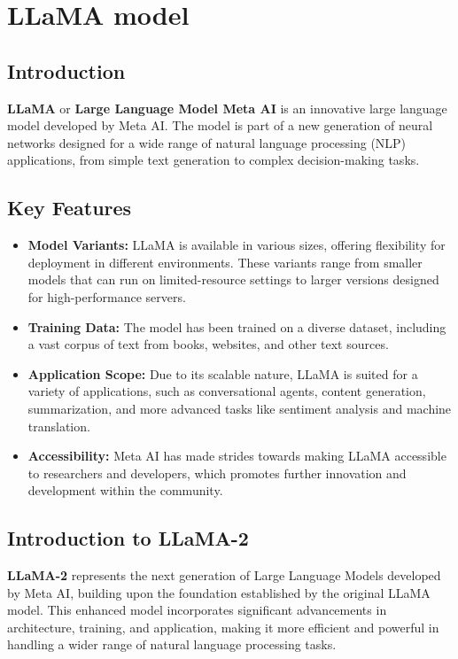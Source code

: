 \section{LLaMA model}

\subsection{Introduction}
\textbf{LLaMA} or \textbf{Large Language Model Meta AI} is an innovative large language model developed by Meta AI. The model is part of a new generation of neural networks designed for a wide range of natural language processing (NLP) applications, from simple text generation to complex decision-making tasks.

\subsection{Key Features}

\begin{itemize}
	\item \textbf{Model Variants:} LLaMA is available in various sizes, offering flexibility for deployment in different environments. These variants range from smaller models that can run on limited-resource settings to larger versions designed for high-performance servers.

	\item \textbf{Training Data:} The model has been trained on a diverse dataset, including a vast corpus of text from books, websites, and other text sources. %

	\item \textbf{Application Scope:} Due to its scalable nature, LLaMA is suited for a variety of applications, such as conversational agents, content generation, summarization, and more advanced tasks like sentiment analysis and machine translation.

	\item \textbf{Accessibility:} Meta AI has made strides towards making LLaMA accessible to researchers and developers, which promotes further innovation and development within the community.
\end{itemize}

\subsection{Introduction to LLaMA-2}
\textbf{LLaMA-2} represents the next generation of Large Language Models developed by Meta AI, building upon the foundation established by the original LLaMA model. This enhanced model incorporates significant advancements in architecture, training, and application, making it more efficient and powerful in handling a wider range of natural language processing tasks.

